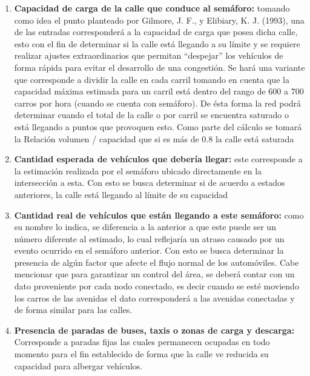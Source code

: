 \begin{enumerate}
	\item \textbf{Capacidad de carga de la calle que conduce al sem\'{a}foro:} tomando como idea el punto planteado por Gilmore, J. F., y Elibiary, K. J. (1993), una de las entradas corresponder\'{a} a la capacidad de carga que posea dicha calle, esto con el fin de determinar si la calle est\'{a} llegando a su l\'{i}mite y se requiere realizar ajustes extraordinarios que permitan “despejar” los veh\'{i}culos de forma r\'{a}pida para evitar el desarrollo de una congesti\'{o}n. Se har\'{a} una variante que corresponde a dividir la calle en cada carril tomando en cuenta que la capacidad m\'{a}xima estimada para un  carril est\'{a} dentro del rango de 600 a 700 carros por hora (cuando se cuenta con sem\'{a}foro). De \'{e}sta forma la red podr\'{a} determinar cuando el total de la calle o por carril se encuentra saturado o est\'{a} llegando a puntos que provoquen esto. Como parte del c\'{a}lculo se tomar\'{a} la Relaci\'{o}n volumen / capacidad que si es m\'{a}s de 0.8 la calle est\'{a} saturada

	\item \textbf{Cantidad esperada de veh\'{i}culos que deber\'{i}a llegar:} este corresponde a la estimaci\'{o}n realizada por el sem\'{a}foro ubicado directamente en la intersecci\'{o}n a esta. Con esto se busca determinar si de acuerdo a estados anteriores, la calle est\'{a} llegando al l\'{i}mite de su capacidad

	\item \textbf{Cantidad real de veh\'{i}culos que est\'{a}n llegando a este sem\'{a}foro:} como su nombre lo indica, se diferencia a la anterior a que este puede ser un n\'{u}mero diferente al estimado, lo cual reflejar\'{i}a un atraso causado por un evento ocurrido en el sem\'{a}foro anterior. Con esto se busca determinar la presencia de alg\'{u}n factor que afecte el flujo normal de los autom\'{o}viles. Cabe mencionar que para garantizar un control del \'{a}rea, se deber\'{a} contar con un dato proveniente por cada nodo conectado, es decir cuando se est\'{e} moviendo los carros de las avenidas el dato corresponder\'{a} a las avenidas conectadas y de forma similar para las calles.

	\item \textbf{Presencia de paradas de buses, taxis o zonas de carga y descarga:} Corresponde a paradas fijas las cuales permanecen ocupadas en todo momento para el fin establecido de forma que la calle ve reducida su capacidad para albergar veh\'{i}culos.


\end{enumerate}
